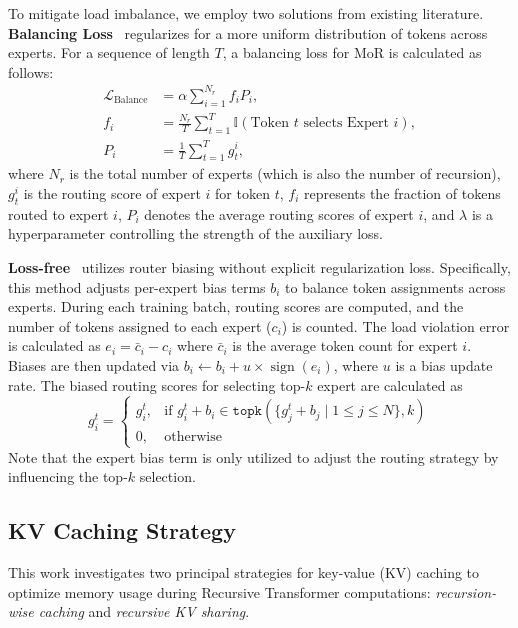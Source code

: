 To mitigate load imbalance, we employ two solutions from existing literature. \textbf{Balancing Loss}~\citep{lepikhin2020gshard, fedus2022switch} regularizes for a more uniform distribution of tokens across experts. For a sequence of length $T$, a balancing loss for MoR is calculated as follows: 
\begin{equation*}
\begin{aligned}
\mathcal{L}_{\text{Balance}} &= \alpha \sum_{i=1}^{N_r} f_i P_i, \\
f_i &= \frac{N_r}{T} \sum_{t=1}^T \mathbb{I}(\text{Token } t \text{ selects Expert } i), \\
P_i &= \frac{1}{T} \sum_{t=1}^T g_t^i,
\end{aligned}
\end{equation*}
where $N_r$ is the total number of experts (which is also the number of recursion), $g_t^i$ is the routing score of expert $i$ for token $t$, $f_i$ represents the fraction of tokens routed to expert $i$, $P_i$ denotes the average routing scores of expert $i$, and $\lambda$ is a hyperparameter controlling the strength of the auxiliary loss.

\textbf{Loss-free}~\citep{wang2024auxiliary} utilizes router biasing without explicit regularization loss. Specifically, this method adjusts per-expert bias terms \(b_i\) to balance token assignments across experts. During each training batch, routing scores are computed, and the number of tokens assigned to each expert ($c_i$) is counted. The load violation error is calculated as $e_i = \bar{c}_i - c_i$ where \(\bar{c}_i\) is the average token count for expert \(i\). Biases are then updated via $b_i \leftarrow b_i + u \times \operatorname{sign}(e_i)$, where \(u\) is a bias update rate.
The biased routing scores for selecting top-$k$ expert are calculated as
\begin{equation*}
g_{i}^t =
\begin{cases}
g_{i}^t, & \text{if } g_{i}^t + b_i \in \texttt{topk}\left(\{g_{j}^t + b_j \mid 1 \leq j \leq N\}, k\right) \\
0, & \text{otherwise}
\end{cases}
\end{equation*}
Note that the expert bias term is only utilized to adjust the routing strategy by influencing the top-$k$ selection.



\clearpage
\subsection{KV Caching Strategy}
This work investigates two principal strategies for key-value (KV) caching to optimize memory usage during Recursive Transformer computations: \textit{recursion-wise caching} and \textit{recursive KV sharing}.

